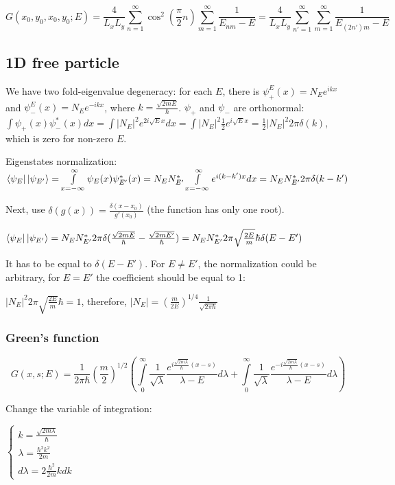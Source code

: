 \documentclass[12pt, a4paper]{article}
\begin{document}
$$G(x_0, y_0, x_0, y_0; E) = \frac{4}{L_x L_y} \sum\limits_{n = 1}^\infty \cos^2(\frac{\pi}{2}n) \sum\limits_{m = 1}^\infty \frac{1}{E_{nm} - E} = \frac{4}{L_x L_y} \sum\limits_{n' = 1}^\infty \sum\limits_{m = 1}^\infty \frac{1}{E_{(2n')m} - E}$$

\subsection{1D free particle}
We have two fold-eigenvalue degeneracy: for each $E$, there is $\psi^E_+(x) = N_E e^{i k x}$ and $\psi^E_-(x) = N_E e^{-i k x}$, where $k = \frac{\sqrt{2 m E}}{\hbar}$. $\psi_+$ and $\psi_-$ are orthonormal: $\int \psi_+(x) \psi^*_-(x) dx = \int |N_E|^2 e^{2 i \sqrt{E} x} dx = \int |N_E|^2 \frac{1}{2} e^{i \sqrt{E} x} = \frac{1}{2} |N_E|^2 2 \pi \delta(k)$, which is zero for non-zero $E$.

Eigenstates normalization: $\bra{\psi_E} \ket{\psi_{E'}} = \int\limits_{x = - \infty}^\infty \psi_E(x) \psi_{E'}^*(x) = N_E N_{E'}^* \int\limits_{x = - \infty}^\infty e^{i (k - k') x} dx = \\ N_E N^*_{E'} 2 \pi \delta(k - k')$

Next, use $\delta(g(x)) = \frac{\delta(x - x_0)}{g'(x_0)}$ (the function has only one root).

$\bra{\psi_E} \ket{\psi_{E'}} = N_E N^*_{E'} 2 \pi \delta(\frac{\sqrt{2 m E}}{\hbar} - \frac{\sqrt{2 m E'}}{\hbar}) = N_E N^*_{E'} 2 \pi \sqrt{\frac{2 E }{m}} \hbar \delta(E - E')$

It has to be equal to $\delta(E - E')$. For $E \ne E'$, the normalization could be arbitrary, for $E = E'$ the coefficient should be equal to 1:

$|N_E|^2 2 \pi \sqrt{\frac{2 E}{m}} \hbar = 1$, therefore, $|N_E| = \left( \frac{m}{2E}\right)^{1/4}  \frac{1}{\sqrt{2 \pi \hbar}}$

\subsubsection{Green's function}
$$G(x, s; E) = \frac{1}{2 \pi \hbar} \left( \frac{m}{2}\right)^{1/2}  \left( \int\limits_{0}^{\infty} \frac{1}{\sqrt{\lambda}}\frac{e^{i \frac{\sqrt{2 m \lambda}}{\hbar} (x - s)}}{\lambda - E} d \lambda + \int\limits_{0}^{\infty} \frac{1}{\sqrt{\lambda}}\frac{e^{-i \frac{\sqrt{2 m \lambda}}{\hbar} (x - s)}}{\lambda - E} d \lambda \right)$$

Change the variable of integration: 

$\begin{cases}
k = \frac{\sqrt{2 m \lambda}}{\hbar} \\
\lambda = \frac{\hbar^2 k^2}{2m}\\
d \lambda = 2\frac{\hbar^2}{2 m} k dk
\end{cases}$
\end{document}
